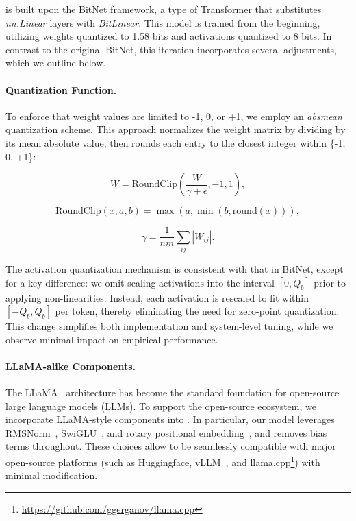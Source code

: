  is built upon the BitNet framework, a type of Transformer that substitutes \emph{nn.Linear} layers with \emph{BitLinear}. This model is trained from the beginning, utilizing weights quantized to 1.58 bits and activations quantized to 8 bits. In contrast to the original BitNet, this iteration incorporates several adjustments, which we outline below.

\paragraph{Quantization Function.} To enforce that weight values are limited to -1, 0, or +1, we employ an \emph{absmean} quantization scheme. This approach normalizes the weight matrix by dividing by its mean absolute value, then rounds each entry to the closest integer within \{-1, 0, +1\}:

\begin{equation}
    \widetilde{W} = \mathrm{RoundClip}(\frac{W}{\gamma + \epsilon}, -1, 1),
\end{equation}

\begin{equation}
    \mathrm{RoundClip}(x, a, b) = \max(a, \min(b, \mathrm{round}(x))),
\end{equation}

\begin{equation}
    \gamma = \frac{1}{nm}\sum_{ij} |W_{ij}|.
\end{equation}

The activation quantization mechanism is consistent with that in BitNet, except for a key difference: we omit scaling activations into the interval $[0, Q_b]$ prior to applying non-linearities. Instead, each activation is rescaled to fit within $[-Q_b, Q_b]$ per token, thereby eliminating the need for zero-point quantization. This change simplifies both implementation and system-level tuning, while we observe minimal impact on empirical performance.

\paragraph{LLaMA-alike Components.}

The LLaMA~\cite{llama, llama2} architecture has become the standard foundation for open-source large language models (LLMs). To support the open-source ecosystem, we incorporate LLaMA-style components into . In particular, our model leverages RMSNorm~\cite{rmsnorm}, SwiGLU~\cite{swiglu}, and rotary positional embedding~\cite{rope}, and removes bias terms throughout. These choices allow  to be seamlessly compatible with major open-source platforms (such as Huggingface, vLLM~\cite{vllm}, and llama.cpp\footnote{\url{https://github.com/ggerganov/llama.cpp}}) with minimal modification.

